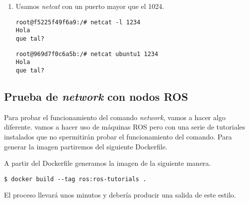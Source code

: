 \begin{enumerate}
\begin{enumerate}
			\item Usamos \textit{netcat} con un puerto mayor que el 1024.
			\begin{lstlisting}[style=consola]
root@f5225f49f6a9:/# netcat -l 1234
Hola
que tal?
			\end{lstlisting}
			\begin{lstlisting}[style=consola]
root@969d7f0c6a5b:/# netcat ubuntu1 1234
Hola
que tal?
			\end{lstlisting}
		\end{enumerate}
	\end{enumerate}

\iffalse

	\subsection{Prueba de \textit{network} con nodos ROS}

	Para probar el funcionamiento del comando \emph{network}, vamos a hacer algo diferente. vamos a hacer uso de máquinas ROS pero con una serie de tutoriales instalados que no spermitirán probar el funcionamiento del comando. Para generar la imagen partiremos del siguiente Dockerfile.

	
	
	A partir del Dockerfile generamos la imagen de la siguiente manera.

	\begin{lstlisting}[style=consola]
$ docker build --tag ros:ros-tutorials .
	\end{lstlisting}

	El proceso llevará unos minutos y debería producir una salida de este estilo.

